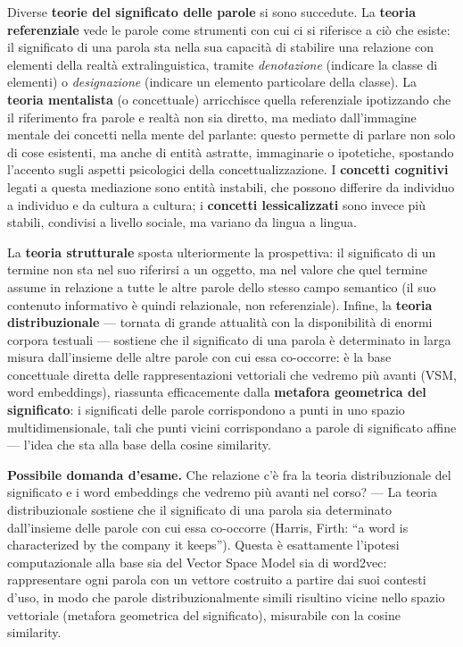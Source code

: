 \documentclass[11pt,a4paper]{report}
\newcommand{\domandaesame}[1]{\begin{esame}\textbf{Possibile domanda d'esame.} #1\end{esame}}
\begin{document}
Diverse \textbf{teorie del significato delle parole} si sono succedute. La \textbf{teoria referenziale} vede le parole come strumenti con cui ci si riferisce a ciò che esiste: il significato di una parola sta nella sua capacità di stabilire una relazione con elementi della realtà extralinguistica, tramite \emph{denotazione} (indicare la classe di elementi) o \emph{designazione} (indicare un elemento particolare della classe). La \textbf{teoria mentalista} (o concettuale) arricchisce quella referenziale ipotizzando che il riferimento fra parole e realtà non sia diretto, ma mediato dall'immagine mentale dei concetti nella mente del parlante: questo permette di parlare non solo di cose esistenti, ma anche di entità astratte, immaginarie o ipotetiche, spostando l'accento sugli aspetti psicologici della concettualizzazione. I \textbf{concetti cognitivi} legati a questa mediazione sono entità instabili, che possono differire da individuo a individuo e da cultura a cultura; i \textbf{concetti lessicalizzati} sono invece più stabili, condivisi a livello sociale, ma variano da lingua a lingua.

La \textbf{teoria strutturale} sposta ulteriormente la prospettiva: il significato di un termine non sta nel suo riferirsi a un oggetto, ma nel valore che quel termine assume in relazione a tutte le altre parole dello stesso campo semantico (il suo contenuto informativo è quindi relazionale, non referenziale). Infine, la \textbf{teoria distribuzionale} --- tornata di grande attualità con la disponibilità di enormi corpora testuali --- sostiene che il significato di una parola è determinato in larga misura dall'insieme delle altre parole con cui essa co-occorre: è la base concettuale diretta delle rappresentazioni vettoriali che vedremo più avanti (VSM, word embeddings), riassunta efficacemente dalla \textbf{metafora geometrica del significato}: i significati delle parole corrispondono a punti in uno spazio multidimensionale, tali che punti vicini corrispondano a parole di significato affine --- l'idea che sta alla base della cosine similarity.

\domandaesame{Che relazione c'è fra la teoria distribuzionale del significato e i word embeddings che vedremo più avanti nel corso? --- La teoria distribuzionale sostiene che il significato di una parola sia determinato dall'insieme delle parole con cui essa co-occorre (Harris, Firth: ``a word is characterized by the company it keeps''). Questa è esattamente l'ipotesi computazionale alla base sia del Vector Space Model sia di word2vec: rappresentare ogni parola con un vettore costruito a partire dai suoi contesti d'uso, in modo che parole distribuzionalmente simili risultino vicine nello spazio vettoriale (metafora geometrica del significato), misurabile con la cosine similarity.}
\end{document}
